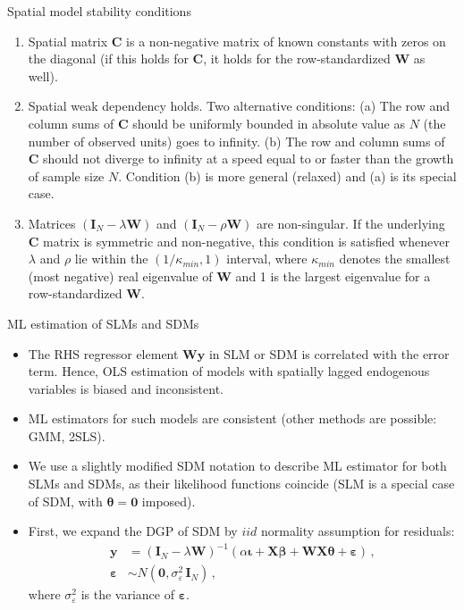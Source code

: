 \documentclass{beamer}
\begin{document}
\begin{frame}{Spatial model stability conditions}
\begin{enumerate}
\item Spatial matrix $\bm{C}$ is a non-negative matrix of known constants with zeros on the diagonal (if this holds for $\bm{C}$, it holds for the row-standardized $\bm{W}$ as well).
\smallskip
\item Spatial weak dependency  holds. Two alternative conditions: (a) The row and column sums of $\bm{C}$ should be uniformly bounded in absolute value as $N$ (the number of observed units) goes to infinity. (b) The row and column sums of $\bm{C}$ should not diverge to infinity at a speed equal to or faster than the growth of sample size $N$. Condition (b) is more general (relaxed) and (a) is its special case.
\smallskip
\item Matrices $(\bm{I}_{N} - \lambda \bm{W})$ and $(\bm{I}_{N} - \rho \bm{W})$ are non-singular. If the underlying $\bm{C}$ matrix is symmetric and non-negative, this condition is satisfied whenever $\lambda$ and $\rho$ lie within the $(1/\kappa_{min}, 1)$ interval, where $\kappa_{min}$ denotes the smallest (most negative) real eigenvalue of $\bm{W}$ and 1 is the largest eigenvalue for a row-standardized $\bm{W}\!.$ \vspace{0.2cm} \\
\end{enumerate}    
\end{frame}
\begin{frame}{ML estimation of SLMs and SDMs}
\begin{itemize}
    \item The RHS regressor element $\bm{W\!y}$ in SLM or SDM is correlated with the error term. Hence, OLS estimation of models with spatially lagged endogenous variables is biased and inconsistent.
    \smallskip 
    \item ML estimators for such models are consistent (other methods are possible: GMM, 2SLS).
    \smallskip
    \item We use a slightly modified SDM notation to describe ML estimator for both SLMs and SDMs, as their likelihood functions coincide (SLM is a special case of SDM, with $\bm{\theta}=\bm{0}$ imposed). 
    \smallskip
    \item First, we expand the DGP of SDM by $\textit{iid}$ normality assumption for residuals: 
    \begin{equation*} 
    \begin{aligned}
    \bm{y} &= (\bm{I}_{N} - \lambda \bm{W})^{-1} (\alpha \bm{\iota} + \bm{X \beta} + \bm{W\!X\theta}+ \bm{\varepsilon})\,, \\ 
    \bm{\varepsilon} &\sim N(\bm{0}, \sigma_{\varepsilon}^2 \, \bm{I}_{N}) \,,
    \end{aligned}
    \end{equation*}
    where $\sigma_{\varepsilon}^2$ is the variance of $\bm{\varepsilon}$.
\end{itemize}
\end{frame}
\end{document}
